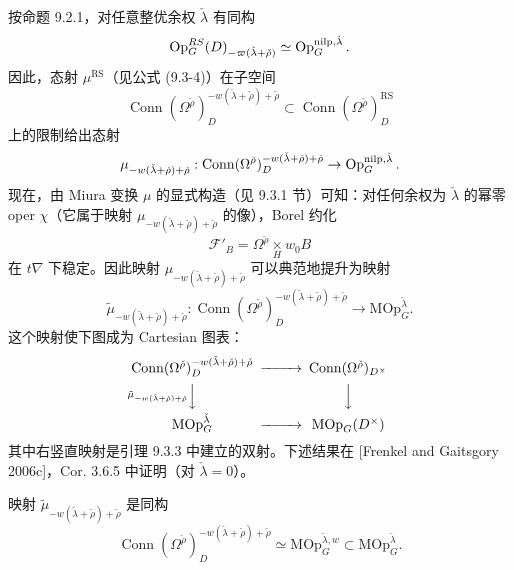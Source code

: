 按命题 9.2.1，对任意整优余权 $\check\lambda$ 有同构
\[
\operatorname{Op}^{RS}_G(D)_{-\varpi(\check\lambda+\check\rho)}\simeq\operatorname{Op}^{\mathrm{nilp},\check\lambda}_G.
\]
因此，态射 $\mu^{\mathrm{RS}}$（见公式 (9.3-4)）在子空间
\[
\operatorname{Conn}(\Omega^{\check\rho})^{-w(\check\lambda+\check\rho)+\check\rho}_D\subset\operatorname{Conn}(\Omega^{\check\rho})^{\mathrm{RS}}_D
\]
上的限制给出态射
\[
\mu_{-w(\check\lambda+\check\rho)+\check\rho}: \operatorname{Conn}(\Omega^{\check\rho})^{-w(\check\lambda+\check\rho)+\check\rho}_D\to\operatorname{Op}^{\mathrm{nilp},\check\lambda}_G.
\]
现在，由 Miura 变换 $\mu$ 的显式构造（见 9.3.1 节）可知：对任何余权为 $\check\lambda$ 的幂零 oper $\chi$（它属于映射 $\mu_{-w(\check\lambda+\check\rho)+\check\rho}$ 的像），Borel 约化
\[
\mathcal{F}'_B = \Omega^{\check\rho}\underset{H}{\times}w_0B
\]
在 $t\nabla$ 下稳定。因此映射 $\mu_{-w(\check\lambda+\check\rho)+\check\rho}$ 可以典范地提升为映射
\begin{equation}
\tilde\mu_{-w(\check\lambda+\check\rho)+\check\rho}: \operatorname{Conn}(\Omega^{\check\rho})^{-w(\check\lambda+\check\rho)+\check\rho}_D\to\mathrm{MOp}^{\check\lambda}_G.
\tag{9.3-12}
\end{equation}
这个映射使下图成为 Cartesian 图表：
\[
\begin{CD}
\operatorname{Conn}(\Omega^{\check\rho})^{-w(\check\lambda+\check\rho)+\check\rho}_D @>>> \operatorname{Conn}(\Omega^{\check\rho})_{D^\times}\\
@V{\tilde\mu_{-w(\check\lambda+\check\rho)+\check\rho}}VV @VVV\\
\mathrm{MOp}^{\check\lambda}_G @>>> \mathrm{MOp}_G(D^\times)
\end{CD}
\]
其中右竖直映射是引理 9.3.3 中建立的双射。下述结果在 [Frenkel and Gaitsgory 2006c]，Cor. 3.6.5 中证明（对 $\check\lambda=0$）。

\begin{theorem}
映射 $\tilde\mu_{-w(\check\lambda+\check\rho)+\check\rho}$ 是同构
\[
\operatorname{Conn}(\Omega^{\check\rho})^{-w(\check\lambda+\check\rho)+\check\rho}_D\simeq\mathrm{MOp}^{\check\lambda,w}_G\subset\mathrm{MOp}^{\check\lambda}_G.
\]
\end{theorem}

